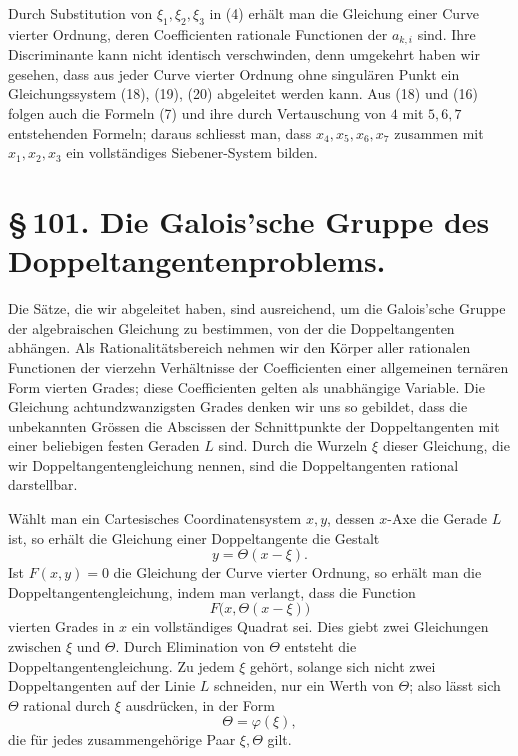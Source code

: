 \documentclass[11pt]{article}
\begin{document}
Durch Substitution von \(\xi_1,\xi_2,\xi_3\) in (4) erhält man die Gleichung einer Curve vierter Ordnung, deren Coefficienten rationale Functionen der \(a_{k,i}\) sind. Ihre Discriminante kann nicht identisch verschwinden, denn umgekehrt haben wir gesehen, dass aus jeder Curve vierter Ordnung ohne singulären Punkt ein Gleichungssystem (18), (19), (20) abgeleitet werden kann. Aus (18) und (16) folgen auch die Formeln (7) und ihre durch Vertauschung von \(4\) mit \(5,6,7\) entstehenden Formeln; daraus schliesst man, dass \(x_4,x_5,x_6,x_7\) zusammen mit \(x_1,x_2,x_3\) ein vollständiges Siebener-System bilden.




\section*{\S\,101. Die Galois'sche Gruppe des Doppeltangentenproblems.}

Die Sätze, die wir abgeleitet haben, sind ausreichend, um die Galois'sche Gruppe der algebraischen Gleichung zu bestimmen, von der die Doppeltangenten abhängen. Als Rationalitätsbereich nehmen wir den Körper aller rationalen Functionen der vierzehn Verhältnisse der Coefficienten einer allgemeinen ternären Form vierten Grades; diese Coefficienten gelten als unabhängige Variable. Die Gleichung achtundzwanzigsten Grades denken wir uns so gebildet, dass die unbekannten Grössen die Abscissen der Schnittpunkte der Doppeltangenten mit einer beliebigen festen Geraden \(L\) sind. Durch die Wurzeln \(\xi\) dieser Gleichung, die wir Doppeltangentengleichung nennen, sind die Doppeltangenten rational darstellbar.

Wählt man ein Cartesisches Coordinatensystem \(x,y\), dessen \(x\)-Axe die Gerade \(L\) ist, so erhält die Gleichung einer Doppeltangente die Gestalt
\begin{equation}
 y=\Theta(x-\xi). \tag{1}
\end{equation}
Ist \(F(x,y)=0\) die Gleichung der Curve vierter Ordnung, so erhält man die Doppeltangentengleichung, indem man verlangt, dass die Function
\[
 F\bigl(x,\Theta(x-\xi)\bigr)
\]
vierten Grades in \(x\) ein vollständiges Quadrat sei. Dies giebt zwei Gleichungen zwischen \(\xi\) und \(\Theta\). Durch Elimination von \(\Theta\) entsteht die Doppeltangentengleichung. Zu jedem \(\xi\) gehört, solange sich nicht zwei Doppeltangenten auf der Linie \(L\) schneiden, nur ein Werth von \(\Theta\); also lässt sich \(\Theta\) rational durch \(\xi\) ausdrücken, in der Form
\begin{equation}
 \Theta=\varphi(\xi), \tag{2}
\end{equation}
die für jedes zusammengehörige Paar \(\xi,\Theta\) gilt.
\end{document}
